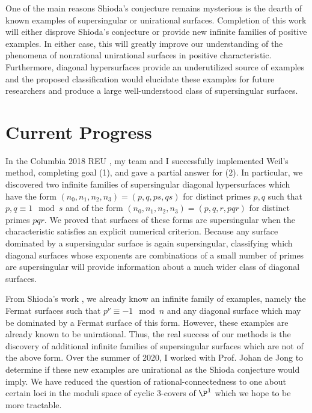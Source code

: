 \documentclass[12pt]{amsart}
\begin{document}
One of the main reasons Shioda's conjecture remains mysterious is the dearth of known examples of supersingular or unirational surfaces. Completion of this work will either disprove Shioda's conjecture or provide new infinite families of positive examples. In either case, this will greatly improve our understanding of the phenomena of nonrational unirational surfaces in positive characteristic. Furthermore, diagonal hypersurfaces provide an underutilized source of examples and the proposed classification would elucidate these examples for future researchers and produce a large well-understood class of supersingular surfaces.

\section*{Current Progress}

In the Columbia 2018 REU \cite{REU}, my team and I successfully implemented Weil's method, completing goal (1), and gave a partial answer for (2). In particular, we discovered two infinite families of supersingular diagonal hypersurfaces which have the form $(n_0, n_1, n_2, n_3) = (p, q, ps, qs)$ for distinct primes $p,q$ such that $p,q \equiv 1 \mod s$ and of the form $(n_0, n_1, n_2, n_3) = (p, q, r, pqr)$ for distinct primes $pqr$. We proved that surfaces of these forms are supersingular when the characteristic satisfies an explicit numerical criterion. Because any surface dominated by a supersingular surface is again supersingular, classifying which diagonal surfaces whose exponents are combinations of a small number of primes are supersingular will provide information about a much wider class of diagonal surfaces.  
\par
From Shioda's work \cite{shioda_on_fermat}, we already know an infinite family of examples, namely the Fermat surfaces such that $p^\nu \equiv - 1 \mod n$ and any diagonal surface which may be dominated by a Fermat surface of this form. However, these examples are already known to be unirational. Thus, the real success of our methods is the discovery of additional infinite families of supersingular surfaces which are not of the above form. Over the summer of 2020, I worked with Prof. Johan de Jong to determine if these new examples are unirational as the Shioda conjecture would imply. We have reduced the question of rational-connectedness to one about certain loci in the moduli space of cyclic $3$-covers of $\P^1$ which we hope to be more tractable. 




\newpage



\end{document}
